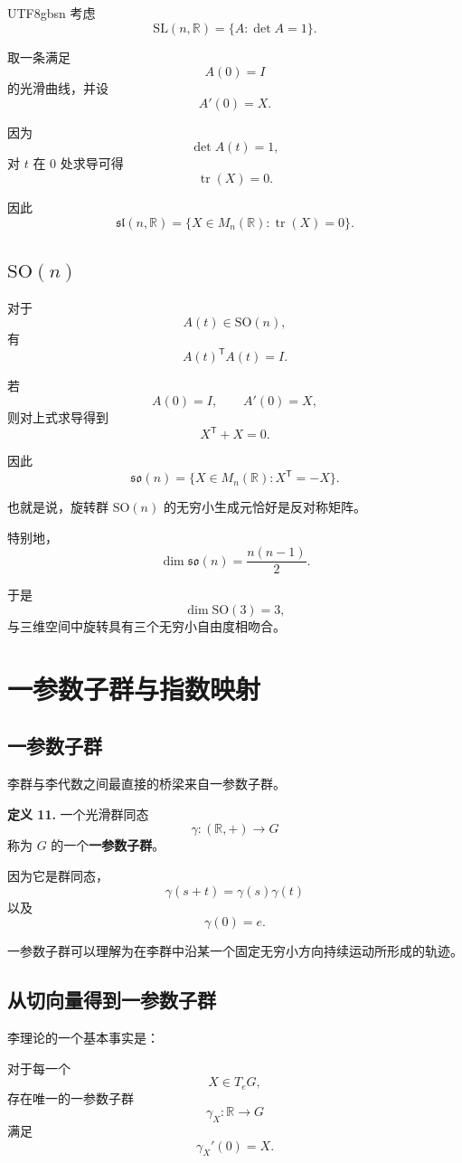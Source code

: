 \documentclass[11pt]{article}
\begin{document}
\begin{CJK*}{UTF8}{gbsn}
考虑
\[
\mathrm{SL}(n,\mathbb{R})
=
\{A:\det A=1\}.
\]

取一条满足
\[
A(0)=I
\]
的光滑曲线，并设
\[
A'(0)=X.
\]

因为
\[
\det A(t)=1,
\]
对 $t$ 在 $0$ 处求导可得
\[
\operatorname{tr}(X)=0.
\]

因此
\[
\mathfrak{sl}(n,\mathbb{R})
=
\{X\in M_n(\mathbb{R}):\operatorname{tr}(X)=0\}.
\]


\subsection{$\mathrm{SO}(n)$}

对于
\[
A(t)\in\mathrm{SO}(n),
\]
有
\[
A(t)^{\mathsf T}A(t)=I.
\]

若
\[
A(0)=I,
\qquad
A'(0)=X,
\]
则对上式求导得到
\[
X^{\mathsf T}+X=0.
\]

因此
\[
\boxed{
\mathfrak{so}(n)
=
\{X\in M_n(\mathbb{R}):X^{\mathsf T}=-X\}.
}
\]

也就是说，旋转群 $\mathrm{SO}(n)$ 的无穷小生成元恰好是反对称矩阵。

特别地，
\[
\dim\mathfrak{so}(n)
=
\frac{n(n-1)}{2}.
\]

于是
\[
\dim\mathrm{SO}(3)=3,
\]
与三维空间中旋转具有三个无穷小自由度相吻合。


\section{一参数子群与指数映射}

\subsection{一参数子群}

李群与李代数之间最直接的桥梁来自一参数子群。

\textbf{定义 11.}
一个光滑群同态
\[
\gamma:(\mathbb{R},+)\to G
\]
称为 $G$ 的一个\textbf{一参数子群}。

因为它是群同态，
\[
\gamma(s+t)
=
\gamma(s)\gamma(t)
\]
以及
\[
\gamma(0)=e.
\]

一参数子群可以理解为在李群中沿某一个固定无穷小方向持续运动所形成的轨迹。


\subsection{从切向量得到一参数子群}

李理论的一个基本事实是：

对于每一个
\[
X\in T_eG,
\]
存在唯一的一参数子群
\[
\gamma_X:\mathbb{R}\to G
\]
满足
\[
\gamma_X'(0)=X.
\]


\end{CJK*}
\end{document}
